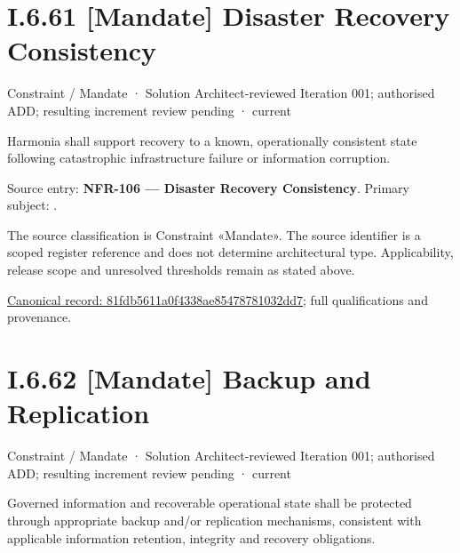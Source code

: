 \section*{I.6.61 [Mandate] Disaster Recovery Consistency}
\label{navigation:I.6.61}

\label{element:81fdb5611a0f4338ae85478781032dd7}
{\small Constraint / Mandate · Solution Architect-reviewed Iteration 001; authorised ADD; resulting increment review pending · current}\par

Harmonia shall support recovery to a known, operationally consistent state following catastrophic infrastructure failure or information corruption.



Source entry: \textbf{NFR-106 — Disaster Recovery Consistency}. Primary subject: \texttt{}.



The source classification is Constraint «Mandate». The source identifier is a scoped register reference and does not determine architectural type. Applicability, release scope and unresolved thresholds remain as stated above.


{\footnotesize \href{../../../../../../../../continuum/motivation/constraint/mandate/81fdb5611a0f4338ae85478781032dd7.md}{Canonical record: 81fdb5611a0f4338ae85478781032dd7}; full qualifications and provenance.}\par
\section*{I.6.62 [Mandate] Backup and Replication}
\label{navigation:I.6.62}

\label{element:8731f88e202a4f5dacb408e5a1d474a8}
{\small Constraint / Mandate · Solution Architect-reviewed Iteration 001; authorised ADD; resulting increment review pending · current}\par

Governed information and recoverable operational state shall be protected through appropriate backup and/or replication mechanisms, consistent with applicable information retention, integrity and recovery obligations.



